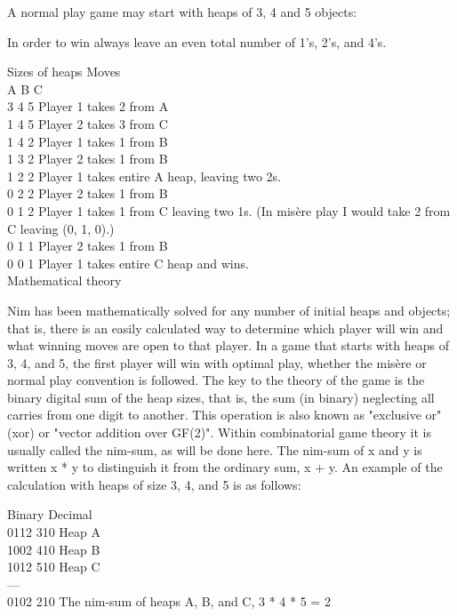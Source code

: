 \documentclass[10pt,letterpaper,twocolumn,twosided]{article}
\begin{document}
A normal play game may start with heaps of 3, 4 and 5 objects:

In order to win always leave an even total number of 1's, 2's, and 4's.

Sizes of heaps  Moves\\
A B C\\
 
3 4 5           Player 1 takes 2 from A\\
1 4 5           Player 2 takes 3 from C\\
1 4 2           Player 1 takes 1 from B\\
1 3 2           Player 2 takes 1 from B\\
1 2 2           Player 1 takes entire A heap, leaving two 2s.\\
0 2 2           Player 2 takes 1 from B\\
0 1 2           Player 1 takes 1 from C leaving two 1s. (In misère play I would take 2 from C leaving (0, 1, 0).)\\
0 1 1           Player 2 takes 1 from B\\
0 0 1           Player 1 takes entire C heap and wins.\\

Mathematical theory

Nim has been mathematically solved for any number of initial heaps and objects; that is, there is an easily calculated way to determine which player will win and what winning moves are open to that player. In a game that starts with heaps of 3, 4, and 5, the first player will win with optimal play, whether the misère or normal play convention is followed.
The key to the theory of the game is the binary digital sum of the heap sizes, that is, the sum (in binary) neglecting all carries from one digit to another. This operation is also known as "exclusive or" (xor) or "vector addition over GF(2)". Within combinatorial game theory it is usually called the nim-sum, as will be done here. The nim-sum of x and y is written x * y to distinguish it from the ordinary sum, x + y. An example of the calculation with heaps of size 3, 4, and 5 is as follows:

Binary  Decimal\\
 
  0112    310    Heap A\\
  1002    410    Heap B\\
  1012    510    Heap C\\
  ---\\
  0102    210    The nim-sum of heaps A, B, and C, 3 * 4 * 5 = 2\\
\end{document}
